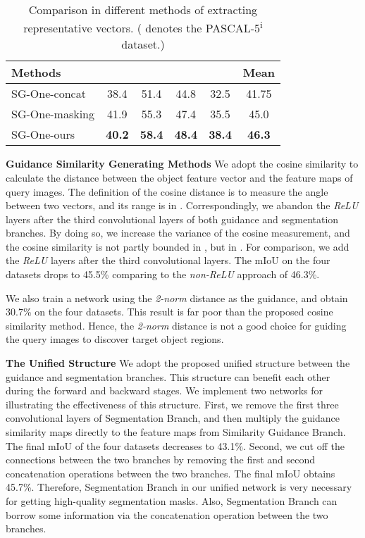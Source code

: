 \documentclass[journal]{IEEEtran}
\begin{document}
\begin{table}\setlength{\tabcolsep}{8pt}
  \centering
  \caption{Comparison in different methods of extracting representative vectors. ( denotes the PASCAL-5\textsuperscript{i} dataset.)}\label{tab_input_process}
  \begin{tabular}{l|cccc|c}
    \hline
    \hline
    \textbf{Methods} &  &  &  &  & Mean \\
    \hline
    SG-One-concat &  38.4 & 51.4 & 44.8 & 32.5 & 41.75 \\
SG-One-masking &  41.9 & 55.3 & 47.4 & 35.5 & 45.0 \\
SG-One-ours & \textbf{40.2} & \textbf{58.4}  & \textbf{48.4}  & \textbf{38.4}  & \textbf{46.3} \\
    \hline
    \hline
  \end{tabular}
  \vspace{-10pt}
\end{table}


\noindent \textbf{Guidance Similarity Generating Methods}
We adopt the cosine similarity to calculate the distance between the object feature vector and the feature maps of query images.
The definition of the cosine distance is to measure the angle between two vectors, and its range is in .
Correspondingly, we abandon the \textit{ReLU} layers after the third convolutional layers of both guidance and segmentation branches.
By doing so, we increase the variance of the cosine measurement, and the cosine similarity is not partly bounded in , but in .
For comparison, we add the \textit{ReLU} layers after the third convolutional layers. 
The mIoU on the four datasets drops to 45.5\% comparing to the \textit{non-ReLU} approach of 46.3\%.

We also train a network using the \textit{2-norm} distance as the guidance, and obtain 30.7\% on the four datasets.
This result is far poor than the proposed cosine similarity method.
Hence, the \textit{2-norm} distance is not a good choice for guiding the query images to discover target object regions.


\noindent \textbf{The Unified Structure}
We adopt the proposed unified structure between the guidance and segmentation branches.
This structure can benefit each other during the forward and backward stages.
We implement two networks for illustrating the effectiveness of this structure.
First, we remove the first three convolutional layers of Segmentation Branch, and then multiply the guidance similarity maps directly to the feature maps from Similarity Guidance Branch.
The final mIoU of the four datasets decreases to 43.1\%.
Second, we cut off the connections between the two branches by removing the first and second concatenation operations between the two branches.
The final mIoU obtains 45.7\%.
Therefore, Segmentation Branch in our unified network is very necessary for getting high-quality segmentation masks.
Also, Segmentation Branch can borrow some information via the concatenation operation between the two branches. 
\end{document}
